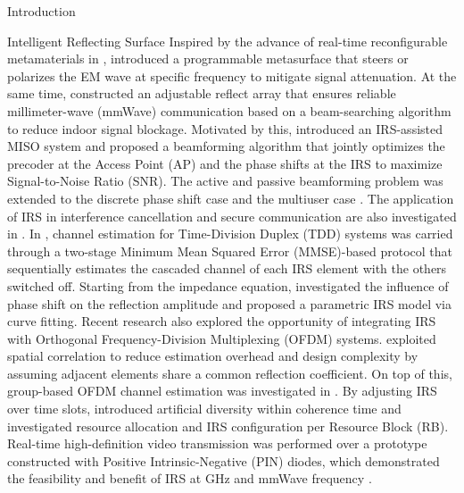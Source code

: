 \documentclass[journal]{IEEEtran}
\begin{document}
\begin{section}{Introduction}
\begin{subsection}{Intelligent Reflecting Surface}
			Inspired by the advance of real-time reconfigurable metamaterials in \cite{Cui2014}, \cite{Liaskos2018} introduced a programmable metasurface that steers or polarizes the EM wave at specific frequency to mitigate signal attenuation. At the same time, \cite{Tan2018} constructed an adjustable reflect array that ensures reliable millimeter-wave (mmWave) communication based on a beam-searching algorithm to reduce indoor signal blockage. Motivated by this, \cite{Wu2018,Wu2019} introduced an IRS-assisted MISO system and proposed a beamforming algorithm that jointly optimizes the precoder at the Access Point (AP) and the phase shifts at the IRS to maximize Signal-to-Noise Ratio (SNR). The active and passive beamforming problem was extended to the discrete phase shift case \cite{Wu2019a} and the multiuser case \cite{Guo2019a}. The application of IRS in interference cancellation and secure communication are also investigated in \cite{Zhou2020,Cui2019}. In \cite{Nadeem2019}, channel estimation for Time-Division Duplex (TDD) systems was carried through a two-stage Minimum Mean Squared Error (MMSE)-based protocol that sequentially estimates the cascaded channel of each IRS element with the others switched off. Starting from the impedance equation, \cite{Abeywickrama2019} investigated the influence of phase shift on the reflection amplitude and proposed a parametric IRS model via curve fitting. Recent research also explored the opportunity of integrating IRS with Orthogonal Frequency-Division Multiplexing (OFDM) systems. \cite{Yang2019} exploited spatial correlation to reduce estimation overhead and design complexity by assuming adjacent elements share a common reflection coefficient. On top of this, group-based OFDM channel estimation was investigated in \cite{Zheng2019}. By adjusting IRS over time slots, \cite{Yang2020} introduced artificial diversity within coherence time and investigated resource allocation and IRS configuration per Resource Block (RB). Real-time high-definition video transmission was performed over a prototype constructed with Positive Intrinsic-Negative (PIN) diodes, which demonstrated the feasibility and benefit of IRS at GHz and mmWave frequency \cite{Dai2020}.
		\end{subsection}



\end{section}
\end{document}
